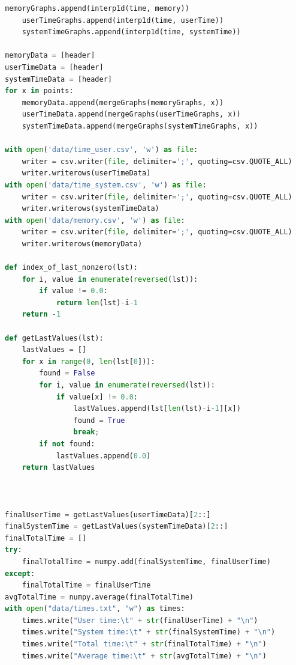 \documentclass[11pt]{report}
\begin{document}
\begin{lstlisting}[language=Python,caption={Automatisierte Build-Messung (runBuild.py)},label={pythonScript}]
    memoryGraphs.append(interp1d(time, memory))
    userTimeGraphs.append(interp1d(time, userTime))
    systemTimeGraphs.append(interp1d(time, systemTime))

memoryData = [header]
userTimeData = [header]
systemTimeData = [header]
for x in points:
    memoryData.append(mergeGraphs(memoryGraphs, x))
    userTimeData.append(mergeGraphs(userTimeGraphs, x))
    systemTimeData.append(mergeGraphs(systemTimeGraphs, x))

with open('data/time_user.csv', 'w') as file:
    writer = csv.writer(file, delimiter=';', quoting=csv.QUOTE_ALL)
    writer.writerows(userTimeData)
with open('data/time_system.csv', 'w') as file:
    writer = csv.writer(file, delimiter=';', quoting=csv.QUOTE_ALL)
    writer.writerows(systemTimeData)
with open('data/memory.csv', 'w') as file:
    writer = csv.writer(file, delimiter=';', quoting=csv.QUOTE_ALL)
    writer.writerows(memoryData)

def index_of_last_nonzero(lst):
    for i, value in enumerate(reversed(lst)):
        if value != 0.0:
            return len(lst)-i-1
    return -1

def getLastValues(lst):
    lastValues = []
    for x in range(0, len(lst[0])):
        found = False
        for i, value in enumerate(reversed(lst)):
            if value[x] != 0.0:
                lastValues.append(lst[len(lst)-i-1][x])
                found = True
                break;
        if not found:
            lastValues.append(0.0)
    return lastValues



finalUserTime = getLastValues(userTimeData)[2::]
finalSystemTime = getLastValues(systemTimeData)[2::]
finalTotalTime = []
try:
    finalTotalTime = numpy.add(finalSystemTime, finalUserTime)
except:
    finalTotalTime = finalUserTime
avgTotalTime = numpy.average(finalTotalTime)
with open("data/times.txt", "w") as times:
    times.write("User time:\t" + str(finalUserTime) + "\n")
    times.write("System time:\t" + str(finalSystemTime) + "\n")
    times.write("Total time:\t" + str(finalTotalTime) + "\n")
    times.write("Average time:\t" + str(avgTotalTime) + "\n")
	\end{lstlisting}

    \glsaddall
    \printglossary
    \printglossary[type=\acronymtype]


    \nocite{*}
    
\end{document}
